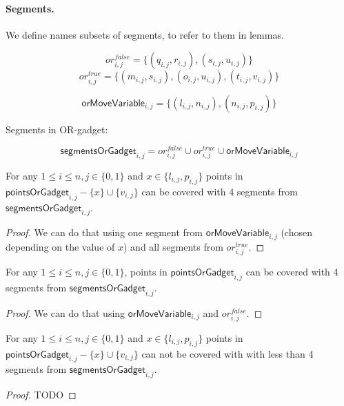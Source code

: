 \paragraph{Segments.}

We define names subsets of segments, to refer to them in lemmas.
 
 
$$or^{false}_{i, j} =
\{ (q_{i, j}, r_{i, j}), (s_{i, j}, u_{i, j})\}$$
$$or^{true}_{i, j} =
\{ (m_{i, j}, s_{i, j}), (o_{i, j}, u_{i, j}),
(t_{i, j}, v_{i, j}) \}$$

$$\mathsf{orMoveVariable}_{i, j} =
\{ (l_{i, j}, n_{i, j}), (n_{i, j}, p_{i, j})\}$$

Segments in OR-gadget:

$$\mathsf{segmentsOrGadget}_{i, j} = 
  or^{false}_{i, j} \cup or^{true}_{i, j} \cup \mathsf{orMoveVariable}_{i, j}
  $$


\begin{lemma}
\label{cover_or_true}
For any $1 \le i \le n, j \in \{0, 1\}$ and 
 $x \in \{l_{i, j}, p_{i, j}\}$ points in
$\mathsf{pointsOrGadget}_{i, j} - \{ x\} \cup \{v_{i, j}\}$
can be covered
with 4 segments from $\mathsf{segmentsOrGadget}_{i,j}$.
\end{lemma}

\begin{proof}
We can do that using one segment from
$\mathsf{orMoveVariable}_{i, j}$
(chosen depending on the value of $x$)
and all segments from $or^{true}_{i, j}$.
\end{proof}

\begin{lemma}
\label{cover_or_false}
For any $1 \le i \le n, j \in \{0, 1\}$, points in
$\mathsf{pointsOrGadget}_{i, j}$ can be covered
with 4 segments from $\mathsf{segmentsOrGadget}_{i,j}$.
\end{lemma}

\begin{proof}
We can do that using  $\mathsf{orMoveVariable}_{i, j}$
and $or^{false}_{i, j}$.
\end{proof}

\begin{lemma}
\label{cover_no_less_true}
For any $1 \le i \le n, j \in \{0, 1\}$ and 
 $x \in \{l_{i, j}, p_{i, j}\}$ points in
$\mathsf{pointsOrGadget}_{i, j} - \{ x\} \cup \{v_{i, j}\}$
can not be covered with
with less than 4 segments from $\mathsf{segmentsOrGadget}_{i,j}$.
\end{lemma}

\begin{proof}
TODO
\end{proof}


